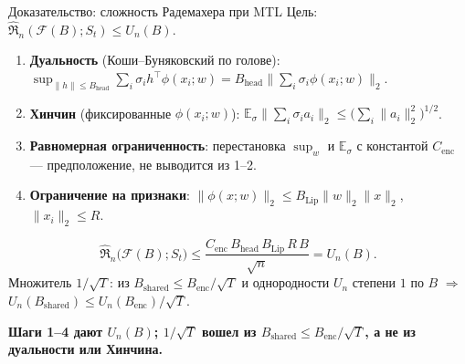 \documentclass[9pt,pdf,hyperref={unicode}]{beamer}
\newcommand{\key}[1]{\par\vspace{0.5ex}\noindent\textbf{\color{darkgreen}#1}}
\begin{document}
\begin{frame}{Доказательство: сложность Радемахера при MTL}
\justifying
\footnotesize
\vspace{-2pt}
Цель: $\widehat{\mathfrak R}_n(\mathcal{F}(B);S_t)\le U_n(B)$.
\begin{enumerate}[1)]
    \item \textbf{Дуальность} (Коши--Буняковский по голове): $\sup_{\|h\|\le B_{\mathrm{head}}}\sum_i\sigma_i h^{\top}\phi(x_i;w)=B_{\mathrm{head}}\bigl\|\sum_i\sigma_i\phi(x_i;w)\bigr\|_2$.
    \item \textbf{Хинчин} (фиксированные $\phi(x_i;w)$): $\mathbb{E}_\sigma\bigl\|\sum_i\sigma_i a_i\bigr\|_2\le\bigl(\sum_i\|a_i\|_2^2\bigr)^{1/2}$.
    \item \textbf{Равномерная ограниченность}: перестановка $\sup_w$ и $\mathbb{E}_\sigma$ с константой $C_{\mathrm{enc}}$ --- предположение, не выводится из 1--2.
    \item \textbf{Ограничение на признаки}: $\|\phi(x;w)\|_2\le B_{\mathrm{Lip}}\|w\|_2\|x\|_2$, $\|x_i\|_2\le R$.
\end{enumerate}
\[
    \widehat{\mathfrak R}_n\!\bigl(\mathcal{F}(B);S_t\bigr)\le
    \frac{C_{\mathrm{enc}}\,B_{\mathrm{head}}\,B_{\mathrm{Lip}}\,R\,B}{\sqrt{n}}=U_n(B).
\]
Множитель $1/\sqrt{T}$: из $B_{\mathrm{shared}}\le B_{\mathrm{enc}}/\sqrt{T}$ и однородности $U_n$ степени $1$ по $B$ $\Rightarrow$ $U_n(B_{\mathrm{shared}})\le U_n(B_{\mathrm{enc}})/\sqrt{T}$.
\vspace{-4pt}
\key{Шаги 1--4 дают $U_n(B)$; $1/\sqrt{T}$ вошел из $B_{\mathrm{shared}}\le B_{\mathrm{enc}}/\sqrt{T}$, а не из дуальности или Хинчина.}
\end{frame}
\end{document}
